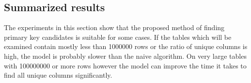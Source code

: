 \subsection{Summarized results}\label{subsec:efficiency-summarized_results}
The experiments in this section show that the proposed method of finding primary key candidates is suitable for some cases. If the tables which will be examined contain mostly less than \num{1000000} rows or the ratio of unique columns is high, the model is probably slower than the naive algorithm. On very large tables with \num{100000000} or more rows however the model can improve the time it takes to find all unique columns significantly. %
